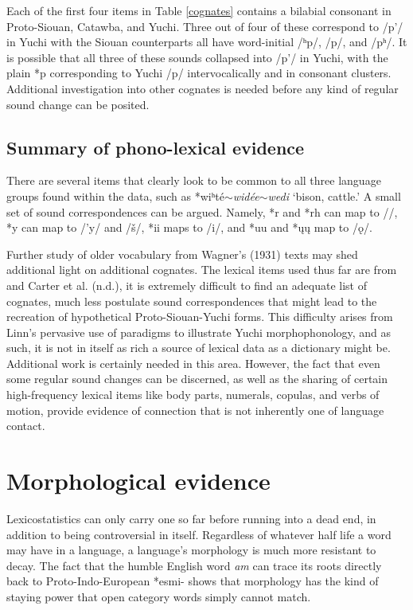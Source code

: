 \documentclass[output=paper]{LSP/langsci}
\begin{document}
Each of the first four items in Table \ref{cognates} contains a bilabial consonant in Proto-Siouan, Catawba, and Yuchi. Three out of four of these correspond to /p'/ in Yuchi with the Siouan counterparts all have word-initial /ʰp/, /p/, and /pʰ/. It is possible that all three of these sounds collapsed into /p'/ in Yuchi, with the plain *p corresponding to Yuchi /p/ intervocalically and in consonant clusters. Additional investigation into other cognates is needed before any kind of regular sound change can be posited.

\subsection{Summary of phono-lexical evidence}

There are several items that clearly look to be common to all three language groups found within the data, such as *wiʰt\'e$\sim$\emph{wid\'ee}$\sim$\emph{wedi} `bison, cattle.' A small set of sound correspondences can be argued. Namely, *r and *rh can map to /\textbeltl/, *y can map to /'y/ and /\v{s}/, *ii maps to /i/, and *uu and *\k{u}\k{u} map to /\k{o}/. 

Further study of older vocabulary from Wagner's (1931) texts may shed additional light on additional cognates. The lexical items used thus far are from \citet{Linn2000} and Carter et al. (n.d.), it is extremely difficult to find an adequate list of cognates, much less postulate sound correspondences that might lead to the recreation of hypothetical Proto-Siouan-Yuchi forms. This difficulty arises from Linn's pervasive use of paradigms to illustrate Yuchi morphophonology, and as such, it is not in itself as rich a source of lexical data as a dictionary might be. Additional work is certainly needed in this area. However, the fact that even some regular sound changes can be discerned, as well as the sharing of certain high-frequency lexical items like body parts, numerals, copulas, and verbs of motion, provide evidence of connection that is not inherently one of language contact.

\section{Morphological evidence}

Lexicostatistics can only carry one so far before running into a dead end, in addition to being controversial in itself. Regardless of whatever half life a word may have in a language, a language's morphology is much more resistant to decay. The fact that the humble English word \textit{am} can trace its roots directly back to Proto-Indo-European *esmi- shows that morphology has the kind of staying power that open category words simply cannot match.
\end{document}
